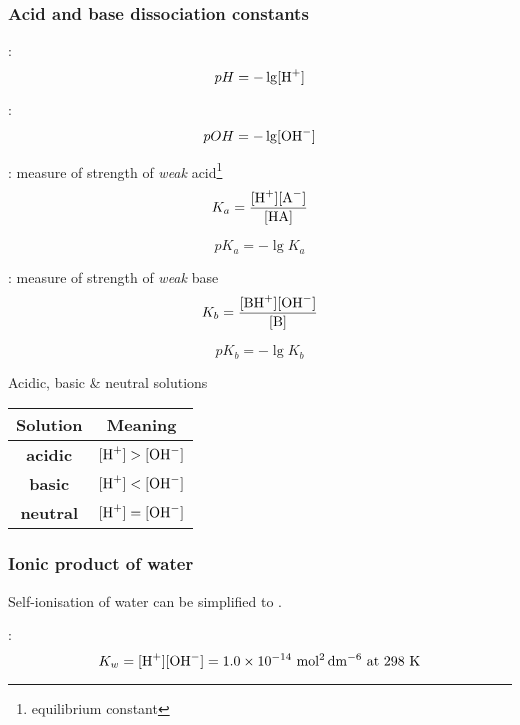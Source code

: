 \subsubsection{Acid and base dissociation constants}
:
\begin{equation}
pH = -\lg [\ce{H+}]
\end{equation}

:
\begin{equation}
pOH = -\lg [\ce{OH-}]
\end{equation}

: measure of strength of \emph{weak} acid\footnote{equilibrium constant}
\begin{equation}
K_a = \frac{[\ce{H+}][\ce{A-}]}{[\ce{HA}]}
\end{equation}

\begin{equation}
pK_a = -\lg K_a
\end{equation}

: measure of strength of \emph{weak} base
\begin{equation}
K_b = \frac{[\ce{BH+}][\ce{OH-}]}{[\ce{B}]}
\end{equation}

\begin{equation}
pK_b = -\lg K_b
\end{equation}

Acidic, basic \& neutral solutions
\begin{table}[H]
\centering
\begin{tabular}{cc}
\hline\hline
Solution & Meaning \\
\hline
\textbf{acidic} & $[\ce{H+}]>[\ce{OH-}]$ \\
\textbf{basic} & $[\ce{H+}]<[\ce{OH-}]$ \\
\textbf{neutral} & $[\ce{H+}]=[\ce{OH-}]$ \\
\hline\hline
\end{tabular}
\end{table}

\subsubsection{Ionic product of water}
Self-ionisation of water can be simplified to .

:
\begin{equation}
K_w = [\ce{H+}][\ce{OH-}] = 1.0\times10^{-14}\,\unit{mol^2\,dm^{-6}} \text{ at 298 K}
\end{equation}


